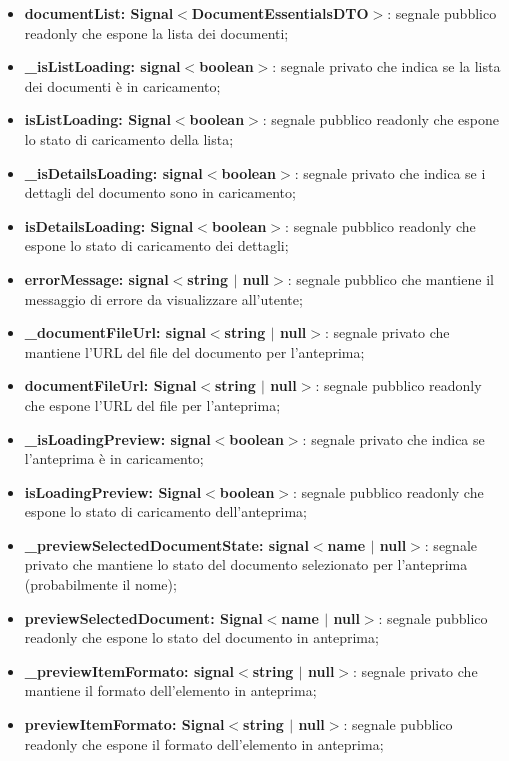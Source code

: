 \documentclass[a4paper,12pt]{article}
\begin{document}
{{{{\begin{itemize}
                    \item \textbf{documentList: Signal$<$DocumentEssentialsDTO$>$}: segnale pubblico readonly che espone la lista dei documenti;
                    \item \textbf{\_isListLoading: signal$<$boolean$>$}: segnale privato che indica se la lista dei documenti è in caricamento;
                    \item \textbf{isListLoading: Signal$<$boolean$>$}: segnale pubblico readonly che espone lo stato di caricamento della lista;
                    \item \textbf{\_isDetailsLoading: signal$<$boolean$>$}: segnale privato che indica se i dettagli del documento sono in caricamento;
                    \item \textbf{isDetailsLoading: Signal$<$boolean$>$}: segnale pubblico readonly che espone lo stato di caricamento dei dettagli;
                    \item \textbf{errorMessage: signal$<$string $|$ null$>$}: segnale pubblico che mantiene il messaggio di errore da visualizzare all'utente;
                    \item \textbf{\_documentFileUrl: signal$<$string $|$ null$>$}: segnale privato che mantiene l'URL del file del documento per l'anteprima;
                    \item \textbf{documentFileUrl: Signal$<$string $|$ null$>$}: segnale pubblico readonly che espone l'URL del file per l'anteprima;
                    \item \textbf{\_isLoadingPreview: signal$<$boolean$>$}: segnale privato che indica se l'anteprima è in caricamento;
                    \item \textbf{isLoadingPreview: Signal$<$boolean$>$}: segnale pubblico readonly che espone lo stato di caricamento dell'anteprima;
                    \item \textbf{\_previewSelectedDocumentState: signal$<$name $|$ null$>$}: segnale privato che mantiene lo stato del documento selezionato per l'anteprima (probabilmente il nome);
                    \item \textbf{previewSelectedDocument: Signal$<$name $|$ null$>$}: segnale pubblico readonly che espone lo stato del documento in anteprima;
                    \item \textbf{\_previewItemFormato: signal$<$string $|$ null$>$}: segnale privato che mantiene il formato dell'elemento in anteprima;
                    \item \textbf{previewItemFormato: Signal$<$string $|$ null$>$}: segnale pubblico readonly che espone il formato dell'elemento in anteprima;

\end{itemize}}}}}
\end{document}
